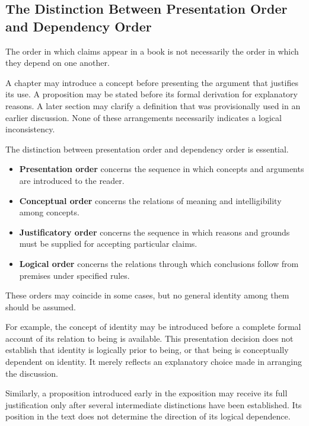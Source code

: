 \subsection{The Distinction Between Presentation Order and
Dependency Order}

The order in which claims appear in a book is not necessarily
the order in which they depend on one another.

A chapter may introduce a concept before presenting the
argument that justifies its use. A proposition may be stated
before its formal derivation for explanatory reasons. A later
section may clarify a definition that was provisionally used
in an earlier discussion. None of these arrangements necessarily
indicates a logical inconsistency.

The distinction between presentation order and dependency
order is essential.

\begin{itemize}
    \item \textbf{Presentation order} concerns the sequence in
    which concepts and arguments are introduced to the reader.

    \item \textbf{Conceptual order} concerns the relations of
    meaning and intelligibility among concepts.

    \item \textbf{Justificatory order} concerns the sequence in
    which reasons and grounds must be supplied for accepting
    particular claims.

    \item \textbf{Logical order} concerns the relations through
    which conclusions follow from premises under specified
    rules.
\end{itemize}

These orders may coincide in some cases, but no general identity
among them should be assumed.

For example, the concept of identity may be introduced before
a complete formal account of its relation to being is available.
This presentation decision does not establish that identity
is logically prior to being, or that being is conceptually
dependent on identity. It merely reflects an explanatory choice
made in arranging the discussion.

Similarly, a proposition introduced early in the exposition
may receive its full justification only after several
intermediate distinctions have been established. Its position
in the text does not determine the direction of its logical
dependence.


